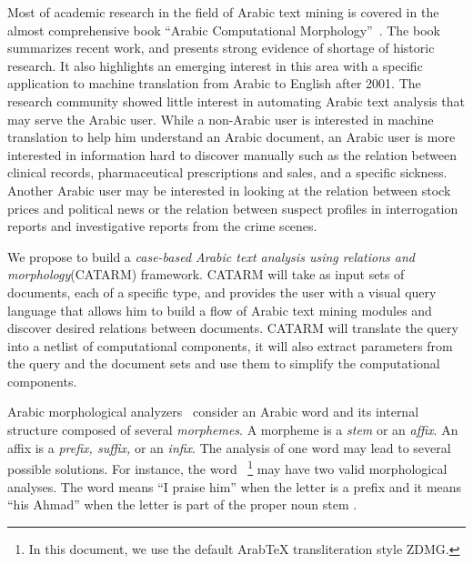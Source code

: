 \documentclass[12pt]{article}
\begin{document}
Most of academic research in the field of Arabic text mining 
is covered in the almost comprehensive book 
``Arabic Computational Morphology''~\cite{Sou07}.
The book summarizes recent work, and presents strong evidence of 
shortage of historic research. It also highlights  an emerging 
interest in this area with a specific application to machine 
translation from Arabic to English after 2001.
The research community showed little interest in 
automating Arabic text analysis that may serve
the Arabic user.
While a non-Arabic user is interested in machine translation to 
help him understand an Arabic document, 
an Arabic user is more interested in 
information hard to discover manually such as 
the relation between clinical records, pharmaceutical 
prescriptions and sales, and a specific sickness. 
Another Arabic user may be interested in looking at the relation
between stock prices and political news or the 
relation between suspect profiles in interrogation reports 
and investigative reports from the crime scenes. 

We propose to build a 
{\em case-based Arabic text analysis using relations and morphology}(CATARM) framework. 
CATARM will take as input sets of documents, each of a specific
type, and provides the user with a visual query language that
allows him to build a flow of Arabic text mining
modules and discover desired relations between documents. 
CATARM will translate the query into a netlist of computational 
components, it will also extract parameters from the query and 
the document sets and use them to simplify the computational 
components. 


Arabic morphological analyzers~\cite{Sughaiyer:04}
consider an Arabic word and its internal structure composed of 
several {\em morphemes}. 
A morpheme is a {\em stem} or an {\em affix}.
An affix is a {\em prefix, suffix,} or an {\em infix}.
The analysis of one word may lead to several possible
solutions.
\vocalize
For instance, the word 
~\footnote{In this document, we use the default 
ArabTeX transliteration style ZDMG.}
may have two valid morphological analyses. 
The word means ``I praise him'' when
the letter  is a prefix and  it means
``his Ahmad'' when 
the letter  is part of the proper noun stem 
.
\novocalize
\end{document}
